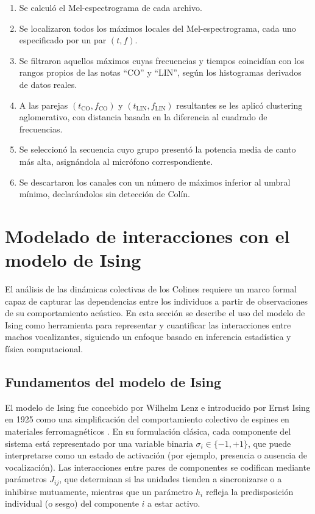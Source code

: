 \begin{enumerate}
  \item Se calculó el Mel-espectrograma de cada archivo.
  \item Se localizaron todos los máximos locales del Mel-espectrograma, cada uno especificado por un par \((t,f)\).
  \item Se filtraron aquellos máximos cuyas frecuencias y tiempos coincidían con los rangos propios de las notas “CO” y “LIN”, según los histogramas derivados de datos reales.
  \item A las parejas \((t_{\mathrm{CO}},f_{\mathrm{CO}})\) y \((t_{\mathrm{LIN}},f_{\mathrm{LIN}})\) resultantes se les aplicó clustering aglomerativo, con distancia basada en la diferencia al cuadrado de frecuencias.
  \item Se seleccionó la secuencia cuyo grupo presentó la potencia media de canto más alta, asignándola al micrófono correspondiente.
  \item Se descartaron los canales con un número de máximos inferior al umbral mínimo, declarándolos sin detección de Colín.
\end{enumerate}


\section{Modelado de interacciones con el modelo de Ising}
\label{sec:modelado_ising}



El análisis de las dinámicas colectivas de los Colines requiere un 
marco formal capaz de capturar las dependencias entre los 
individuos a partir de observaciones de su comportamiento 
acústico. En esta sección se describe el uso del modelo de 
Ising como herramienta para representar y cuantificar las 
interacciones entre machos vocalizantes, siguiendo un enfoque 
basado en inferencia estadística y física computacional.

\subsection{Fundamentos del modelo de Ising}

El modelo de Ising fue concebido por Wilhelm Lenz e introducido por Ernst Ising en 1925 como 
una simplificación del comportamiento colectivo de espines en 
materiales ferromagnéticos \cite{ising1925beitrag}. En su 
formulación clásica, cada componente del sistema está 
representado por una variable binaria \( \sigma_i \in \{-1, +1\} \), 
que puede interpretarse como un estado de activación 
(por ejemplo, presencia o ausencia de vocalización). Las 
interacciones entre pares de componentes se codifican mediante 
parámetros \( J_{ij} \), que determinan si las unidades tienden 
a sincronizarse o a inhibirse mutuamente, mientras que un 
parámetro \( h_i \) refleja la predisposición individual (o 
sesgo) del componente \( i \) a estar activo.

